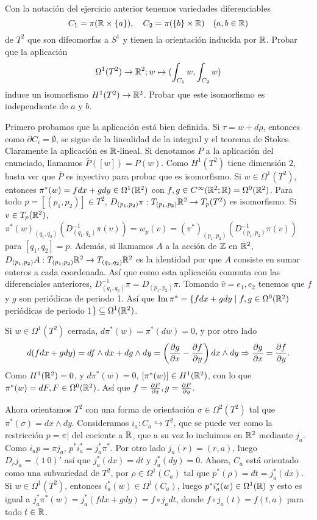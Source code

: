 \documentclass[twoside]{article}
\begin{document}
\begin{ejercicio}{10.2}
Con la notación del ejercicio anterior tenemos variedades diferenciables
\[
C_1=\pi(\mathbb{R}\times\{a\}),\quad C_2=\pi(\{b\}\times\mathbb{R})\quad (a,b\in\mathbb{R})
\]
de $T^2$ que son difeomorfas a $S^1$ y tienen la orientación inducida por $\mathbb{R}$. Probar que la aplicación
\[
\Omega^1(T^2)\to\mathbb{R}^2; w\mapsto (\int_{C_1}w, \int_{C_2}w)
\]
induce un isomorfismo $H^1(T^2)\to \mathbb{R}^2$. Probar que este isomorfismo es independiente de $a$ y $b$.
\end{ejercicio}
\begin{solucion}
Primero probamos que la aplicación está bien definida. Si $\tau=w+d\rho$, entonces como $\partial C_i=\emptyset$, se sigue de la linealidad de la integral y el teorema de Stokes. Claramente la aplicación es $\mathbb{R}$-lineal. Si denotamos $P$ a la aplicación del enunciado, llamamos $\bar{P}([w])=P(w)$. Como $H^1(T^2)$ tiene dimensión 2, basta ver que $\bar{P}$ es inyectivo para probar que es isomorfismo. Si $w\in\Omega^1(T^2)$, entonces $\pi^*(w)=fdx+gdy\in\Omega^1(\mathbb{R}^2)$ con $f,g\in C^{\infty}(\mathbb{R}^2;\mathbb{R})=\Omega^0(\mathbb{R}^2)$. Para todo $p=[(p_1,p_2)]\in T^2$, $D_{(p_1,p_2)}\pi:T_{(p_1,p_2)}\mathbb{R}^2\to T_p(T^2)$ es isomorfismo. Si $v\in T_p(\mathbb{R}^2)$, $\pi^*(w)_{(q_1,q_2)}(D^{-1}_{(q_1,q_2)}\pi(v))=w_p(v)=(\pi^*)_{(p_1,p_2)}(D^{-1}_{(p_1,p_2)}\pi(v))$ para $[q_1,q_2]=p$.   Además, si llamamos $A$ a la acción de $\mathbb{Z}$ en $\mathbb{R}^2$, $D_{(p_1,p_2)}A:T_{(p_1,p_2)}\mathbb{R}^2\to T_{(q_1,q_2)}\mathbb{R}^2$ es la identidad por que $A$ consiste en sumar enteros a cada coordenada. Así que como esta aplicación conmuta con las diferenciales anteriores, $D^{-1}_{(q_1,q_2)}\pi=D_{(p_1,p_2)}\pi$. Tomando $\hat{v}=e_1,e_2$ tenemos que $f$ y $g$ son periódicas de periodo 1. Así que $\operatorname{Im}{\pi^*}=\{fdx+gdy\mid f,g\in\Omega^0(\mathbb{R}^2)$ periódicas de periodo 1$\}\subseteq\Omega^1(\mathbb{R}^2)$. 

Si $w\in\Omega^1(T^2)$ cerrada, $d\pi^*(w)=\pi^*(dw)=0$, y por otro lado
\[
d(fdx+gdy)=df\land dx+dg\land dy=\left(\frac{\partial g}{\partial x}-\frac{\partial f}{\partial y}\right)dx\land dy\Rightarrow \frac{\partial g}{\partial x}=\frac{\partial f}{\partial y}.
\] 
Como $H^1(\mathbb{R}^2)=0$, y $d\pi^*(w)=0$, $[\pi^*(w)]\in H^1(\mathbb{R}^2)$, con lo que $\pi^*(w)=dF, F\in\Omega^0(\mathbb{R}^2)$. Así que $f=\frac{\partial F}{\partial x}, g=\frac{\partial F}{\partial y}$.

Ahora orientamos $T^2$ con una forma de orientación $\sigma\in\Omega^2(T^2)$ tal que $\pi^*(\sigma)=dx\land dy$. Consideramos $i_a:C_a\hookrightarrow T^2$, que se puede ver como la restricción $p=\pi|$ del cociente a $\mathbb{R}$, que a su vez lo incluimos en $\mathbb{R}^2$ mediante $j_a$. Como $i_ap=\pi j_a$, $p^*i_a^*=j_a^*\pi^*$. Por otro lado $j_a(r)=(r,a)$, luego $D_rj_a=(1\ 0)'$ así que $j_a^*(dx)=dt$ y $j_a^*(dy)=0$. Ahora, $C_a$ está orientado como una subvariedad de $T^2$, por $\rho\in\Omega^1(C_a)$ tal que $p^*(\rho)=dt=j_a^*(dx)$. Si $w\in\Omega^1(T^2)$, entonces $i_a^*(w)\in\Omega^1(C_a)$, luego $p^*i_a^*(w)\in\Omega^1(\mathbb{R})$ y esto es igual a $j_a^*\pi^*(w)=j_a^*(fdx+gdy)=f\circ j_a dt$, donde $f\circ j_a(t)=f(t,a)$ para todo $t\in\mathbb{R}$.


\end{solucion}
\end{document}
